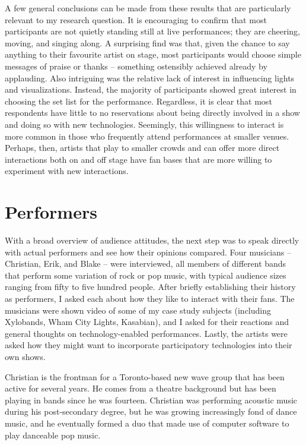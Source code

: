 A few general conclusions can be made from these results that are particularly relevant to my research question. It is encouraging to confirm that most participants are not quietly standing still at live performances; they are cheering, moving, and singing along. A surprising find was that, given the chance to say anything to their favourite artist on stage, most participants would choose simple messages of praise or thanks -- something ostensibly achieved already by applauding. Also intriguing was the relative lack of interest in influencing lights and visualizations. Instead, the majority of participants showed great interest in choosing the set list for the performance. Regardless, it is clear that most respondents have little to no reservations about being directly involved in a show and doing so with new technologies. Seemingly, this willingness to interact is more common in those who frequently attend performances at smaller venues. Perhaps, then, artists that play to smaller crowds and can offer more direct interactions both on and off stage have fan bases that are more willing to experiment with new interactions.


\section{Performers}

With a broad overview of audience attitudes, the next step was to speak directly with actual performers and see how their opinions compared. Four musicians -- Christian, Erik, and Blake -- were interviewed, all members of different bands that perform some variation of rock or pop music, with typical audience sizes ranging from fifty to five hundred people. After briefly establishing their history as performers, I asked each about how they like to interact with their fans. The musicians were shown video of some of my case study subjects (including Xylobands, Wham City Lights, Kasabian), and I asked for their reactions and general thoughts on technology-enabled performances. Lastly, the artists were asked how they might want to incorporate participatory technologies into their own shows.

Christian is the frontman for a Toronto-based new wave group that has been active for several years. He comes from a theatre background but has been playing in bands since he was fourteen. Christian was performing acoustic music during his post-secondary degree, but he was growing increasingly fond of dance music, and he eventually formed a duo that made use of computer software to play danceable pop music.

